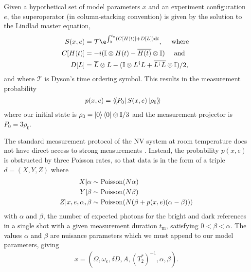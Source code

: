 \documentclass[aps,nofootinbib,twocolumn,superscriptaddress]{revtex4}
\newcommand{\mps}{x}
\newcommand{\eps}{e}
\newcommand{\data}{d}
\newcommand{\te}{t_\text{e}}
\newcommand{\tm}{t_\text{m}}
\renewcommand{\H}{H}    %
\renewcommand{\L}{L}    %
\renewcommand{\S}{S}    %
\begin{document}
Given a hypothetical set of model parameters $\mps$ and
an experiment configuration $\eps$, the superoperator
(in column-stacking convention) is given by the solution
to the Lindlad master equation,
\begin{subequations}
\begin{align}
    S(\mps,\eps)
        &=\mathcal{T}\e^{\int_0^{\te}(C[\H(t)]+D[\L])\dd t},
        \quad\text{ where } \\
    C[\H(t)]
        &=-i(\I\otimes\H(t)-\overline{\H(t)}\otimes\I)
        \quad\text{ and } \\
    D[L]
        &= \overline{L}\otimes L
            -(\I\otimes L^\dagger L + \overline{L^\dagger L}\otimes \I) / 2,
\end{align}
\end{subequations}
and where $\mathcal{T}$ is Dyson's time ordering symbol.
This results in the measurement probability
\begin{align}
    p(\mps,\eps)
        &=  \dbra{P_0} \S(\mps,\eps)\dket{\rho_0}
    \label{eq:born-rule}
\end{align}
where our initial state is $\rho_0=\ket{0}\bra{0}\otimes\mathbb{I}/3$
and the measurement projector is $P_0=3\rho_0$.

The standard measurement protocol of the NV system at room
temperature does not have direct access to strong measurements
\cite{hincks_statistical_2018}.
Instead, the probability $p(\mps,\eps)$ is obstructed by three Poisson
rates, so that data is in the form of a triple $\data=(X,Y,Z)$
where
\begin{subequations}
\begin{align}
    X|\alpha
        & \sim\poissondist(N\alpha) \\
    Y|\beta
        & \sim\poissondist(N\beta) \\
    Z|\mps,\eps,\alpha,\beta
        & \sim\poissondist(N(\beta+p(\mps,\eps)(\alpha-\beta)))
\end{align}
\label{eq:nv-measurement}%
\end{subequations}
with $\alpha$ and $\beta$,
the number of expected
photons for the bright and dark references in a single shot with a
given measurement duration $\tm$,
 satisfying $0<\beta<\alpha$.
The values $\alpha$ and $\beta$ are nuisance parameters which we
must append to our model parameters, giving
\begin{align}
    \mps=(\Omega,\omega_e,\delta D,A,(T_2^*)^{-1},\alpha,\beta).
    \label{eq:nv-model-parameters}
\end{align}
\end{document}
